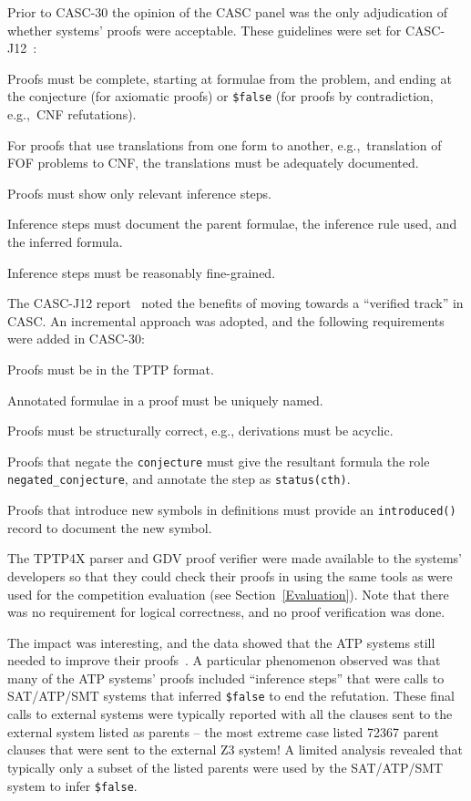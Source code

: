 \documentclass[aic]{iosart2x}
\newcommand{\smalltt}[1]{\small \texttt{#1}}
\newenvironment{packed_enumerate}{
\vspace*{-0.3em}
\begin{enumerate}
  \setlength{\partopsep}{0pt}
  \setlength{\itemsep}{1pt}
  \setlength{\parskip}{0pt}
  \setlength{\parsep}{0pt}
}{\end{enumerate}}
\newcommand{\LAST}{\mbox{CASC-30}}
\begin{document}
Prior to \LAST{} the opinion of the CASC panel was the only adjudication of whether systems' 
proofs were acceptable. 
These guidelines were set for CASC-J12~\cite{Sut24-CASC-J12}:
\begin{packed_enumerate}
\item[1.] Proofs must be complete, starting at formulae from the problem, and ending at the 
      conjecture (for axiomatic proofs) or \smalltt{\$false} (for proofs by contradiction, 
      e.g.,~CNF refutations).
\item[2.] For proofs that use translations from one form to another, e.g.,~translation of FOF 
      problems to CNF, the translations must be adequately documented.
\item[3.] Proofs must show only relevant inference steps.
\item[4.] Inference steps must document the parent formulae, the inference rule used, and the 
      inferred formula.
\item[5.] Inference steps must be reasonably fine-grained.
\end{packed_enumerate}
The CASC-J12 report~\cite{Sut25-CASC} noted the benefits of moving towards a ``verified track'' 
in CASC.
An incremental approach was adopted, and the following requirements were added in \LAST{}:
\begin{packed_enumerate}
\item[6.] Proofs must be in the TPTP format.
\item[7.] Annotated formulae in a proof must be uniquely named.
\item[8.] Proofs must be structurally correct, e.g., derivations must be acyclic.
\item[9.] Proofs that negate the \smalltt{conjecture} must give the resultant formula the role 
      \smalltt{negated\_conjecture}, and annotate the step as \smalltt{status(cth)}.
\item[10.] Proofs that introduce new symbols in definitions must provide an \smalltt{introduced()} 
      record to document the new symbol.
\end{packed_enumerate}
The TPTP4X parser and GDV proof verifier were made available to the 
systems' developers so that they could check their proofs in using the same tools as were used for 
the competition evaluation (see Section~\ref{Evaluation}).
Note that there was no requirement for logical correctness, and no proof verification was done.

The impact was interesting, and the data showed that the ATP systems still needed to improve 
their proofs~\cite{Sut26-CASC}.
A particular phenomenon observed was that many of the ATP systems' proofs included ``inference 
steps'' that were calls to SAT/ATP/SMT systems that inferred {\tt \$false} to end the refutation.
These final calls to external systems were typically reported with all the clauses sent to the 
external system listed as parents -- the most extreme case listed 72367 parent clauses that were 
sent to the external Z3 system!
A limited analysis revealed that typically only a subset of the listed parents were used by the 
SAT/ATP/SMT system to infer {\tt \$false}.
\end{document}
